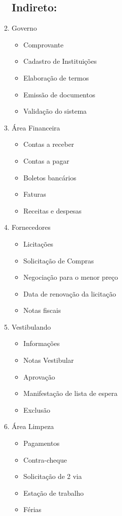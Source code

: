 \begin{enumerate}
	\subsection {Indireto:}
	\item Governo
		\begin{itemize}
		\item Comprovante
		\item Cadastro de Instituições
		\item Elaboração de termos
		\item Emissão de documentos
		\item Validação do sistema
		\end{itemize}
			
	\item Área Financeira
		\begin{itemize}
		\item Contas a receber
		\item Contas a pagar
		\item Boletos bancários
		\item Faturas
		\item Receitas e despesas
		\end{itemize}

						
	\item Fornecedores
		\begin{itemize}
		\item Licitações
		\item Solicitação de Compras
		\item Negociação para o menor preço
		\item Data de renovação da licitação
		\item Notas fiscais
		\end{itemize}
		
	\item Vestibulando
		\begin{itemize}
		\item Informações
		\item Notas Vestibular
		\item Aprovação		
		\item Manifestação de lista de espera
		\item Exclusão
		\end{itemize}
					
	\item Área Limpeza
		\begin{itemize}
		\item Pagamentos
		\item Contra-cheque
		\item Solicitação de 2 via
		\item Estação de trabalho
		\item Férias
		\end{itemize}
		\end{enumerate}
		
